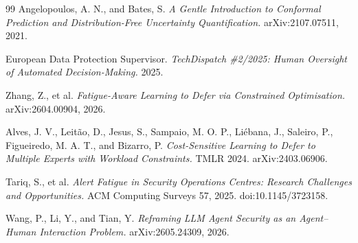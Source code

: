 \documentclass[11pt]{article}
\begin{document}
\begin{thebibliography}{99}
 Angelopoulos, A. N., and Bates, S. \emph{A Gentle Introduction to Conformal
Prediction and Distribution-Free Uncertainty Quantification.} arXiv:2107.07511, 2021.

 European Data Protection Supervisor. \emph{TechDispatch \#2/2025: Human Oversight of
Automated Decision-Making.} 2025.

 Zhang, Z., et al. \emph{Fatigue-Aware Learning to Defer via Constrained
Optimisation.} arXiv:2604.00904, 2026.

 Alves, J. V., Leit\~ao, D., Jesus, S., Sampaio, M. O. P., Li\'ebana, J., Saleiro, P.,
Figueiredo, M. A. T., and Bizarro, P. \emph{Cost-Sensitive Learning to Defer to Multiple Experts with
Workload Constraints.} TMLR 2024. arXiv:2403.06906.

 Tariq, S., et al. \emph{Alert Fatigue in Security Operations Centres: Research
Challenges and Opportunities.} ACM Computing Surveys 57, 2025. doi:10.1145/3723158.

 Wang, P., Li, Y., and Tian, Y. \emph{Reframing LLM Agent Security as an Agent--Human
Interaction Problem.} arXiv:2605.24309, 2026.

\end{thebibliography}
\end{document}
